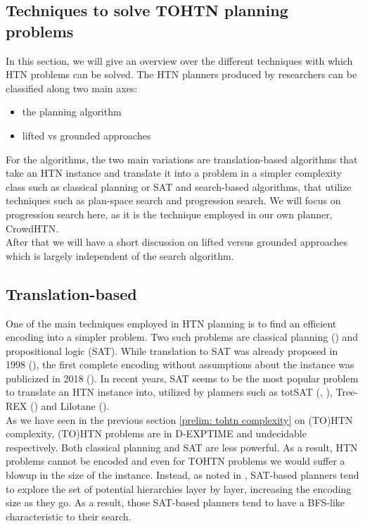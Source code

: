 \subsection{Techniques to solve TOHTN planning problems}
In this section, we will give an overview over the different techniques with which HTN problems can be solved. The HTN planners produced by researchers can be classified along two main axes:
\begin{itemize}
	\item the planning algorithm
	\item lifted vs grounded approaches
\end{itemize}
For the algorithms, the two main variations are translation-based algorithms that take an HTN instance and translate it into a problem in a simpler complexity class such as classical planning or SAT and search-based algorithms, that utilize techniques such as plan-space search and progression search. We will focus on progression search here, as it is the technique employed in our own planner, CrowdHTN. \\
After that we will have a short discussion on lifted versus grounded approaches which is largely independent of the search algorithm.
\begin{comment}
- multiple ways to solve HTN instances
- planners can be classified on two axis: the algorithm and lifted vs grounded
- in practise, most algorithms are based on translation to SAT or on search algorithms
- we will focus on search-based as we will see in later section \ref{prelim: crowdhtn} that this is what our own planner utilizes
\end{comment}

\subsection{Translation-based} 
\label{prelim: translation based planners}
One of the main techniques employed in HTN planning is to find an efficient encoding into a simpler problem. Two such problems are classical planning (\cite{alford2016bound}) and propositional logic (SAT). While translation to SAT was already proposed in 1998 (\cite{mali1998encoding}), the first complete encoding without assumptions about the instance was publicized in 2018 (\cite{behnke2018totsat}). In recent years, SAT seems to be the most popular problem to translate an HTN instance into, utilized by planners such as totSAT (\cite{behnke2018totsat}, \cite{behnke2018tracking}), Tree-REX (\cite{schreiber2019tree}) and Lilotane (\cite{schreiber2021lilotane}). \\
As we have seen in the previous section \ref{prelim: tohtn complexity} on (TO)HTN complexity, (TO)HTN problems are in D-EXPTIME and undecidable respectively. Both classical planning and SAT are less powerful. As a result, HTN problems cannot be encoded and even for TOHTN problems we would suffer a blowup in the size of the instance. Instead, as noted in \cite{schreiber2019tree}, SAT-based planners tend to explore the set of potential hierarchies layer by layer, increasing the encoding size as they go. As a result, those SAT-based planners tend to have a BFS-like characteristic to their search.

